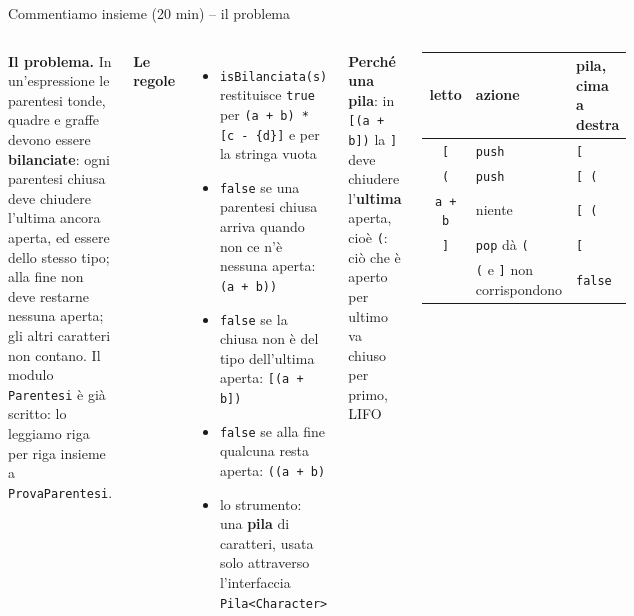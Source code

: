 \documentclass[10pt,aspectratio=169,xcolor={table}]{beamer}
\begin{document}
\begin{frame}[fragile]{Commentiamo insieme (20 min) -- il problema}
\begin{columns}[T]
\footnotesize
\textbf{Il problema.} In un'espressione le parentesi tonde, quadre e graffe devono essere \textbf{bilanciate}: ogni parentesi chiusa deve chiudere l'ultima ancora aperta, ed essere dello stesso tipo; alla fine non deve restarne nessuna aperta; gli altri caratteri non contano. Il modulo \texttt{Parentesi} è già scritto: lo leggiamo riga per riga insieme a \texttt{ProvaParentesi}.

\vspace{0.1cm}
\textbf{Le regole}
\begin{itemize}\itemsep=2pt
    \item \texttt{isBilanciata(s)} restituisce \texttt{true} per \texttt{(a + b) * [c - \{d\}]} e per la stringa vuota
    \item \texttt{false} se una parentesi chiusa arriva quando non ce n'è nessuna aperta: \texttt{(a + b))}
    \item \texttt{false} se la chiusa non è del tipo dell'ultima aperta: \texttt{[(a + b])}
    \item \texttt{false} se alla fine qualcuna resta aperta: \texttt{((a + b)}
    \item lo strumento: una \textbf{pila} di caratteri, usata solo attraverso l'interfaccia \texttt{Pila<Character>}
\end{itemize}

\footnotesize
\textbf{Perché una pila}: in \texttt{[(a + b])} la \texttt{]} deve chiudere l'\textbf{ultima} aperta, cioè \texttt{(}: ciò che è aperto per ultimo va chiuso per primo, LIFO
\begin{center}
\scriptsize\renewcommand{\arraystretch}{1.25}\setlength{\tabcolsep}{4pt}
\begin{tabular}{|c|l|l|}
\hline
\textbf{letto} & \textbf{azione} & \textbf{pila, cima a destra} \\
\hline
\texttt{[} & \texttt{push} & \texttt{[} \\
\hline
\texttt{(} & \texttt{push} & \texttt{[ (} \\
\hline
\texttt{a + b} & niente & \texttt{[ (} \\
\hline
\texttt{]} & \texttt{pop} dà \texttt{(} & \texttt{[} \\
\hline
 & \texttt{(} e \texttt{]} non corrispondono & \texttt{false} \\
\hline
\end{tabular}
\end{center}
\end{columns}
\end{frame}
\end{document}
